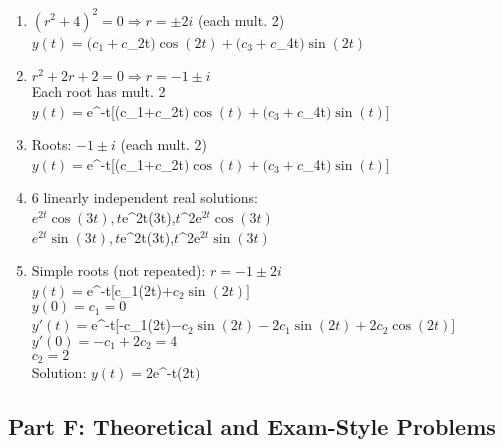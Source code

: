 \documentclass[12pt]{article}
\begin{document}
\begin{enumerate}[resume]
\item $(r^{2} + 4)^{2} = 0 \Rightarrow r = \pm 2i$ (each mult. 2)\\
$y(t) = (c_{1} + c$_{2t}$)\cos(2t) + (c_{3} + c$_{4t}$)\sin(2t)$

\item $r^{2} + 2r + 2 = 0 \Rightarrow r = -1 \pm i$\\
Each root has mult. 2\\
$y(t) = $e^{-t}[(c_{1}$ + c$_{2t}$)\cos(t) + (c_{3} + c$_{4t}$)\sin(t)]$

\item Roots: $-1 \pm i$ (each mult. 2)\\
$y(t) = $e^{-t}[(c_{1}$ + c$_{2t}$)\cos(t) + (c_{3} + c$_{4t}$)\sin(t)]$

\item 6 linearly independent real solutions:\\
$e^{2t}\cos(3t), t$e^{2t}\cos(3t),$ t$^{2e}$^{2t}\cos(3t)$\\
$e^{2t}\sin(3t), t$e^{2t}\sin(3t),$ t$^{2e}$^{2t}\sin(3t)$

\item Simple roots (not repeated): $r = -1 \pm 2i$\\
$y(t) = $e^{-t}[c_{1}\cos(2t)$ + c_{2}\sin(2t)]$\\
$y(0) = c_{1} = 0$\\
$y'(t) = $e^{-t}[-c_{1}\cos(2t)$ - c_{2}\sin(2t) - 2c_{1}\sin(2t) + 2c_{2}\cos(2t)]$\\
$y'(0) = -c_{1} + 2c_{2} = 4$\\
$c_{2} = 2$\\
Solution: $y(t) = 2$e^{-t}\sin(2t$)$
\end{enumerate}

\subsection*{Part F: Theoretical and Exam-Style Problems}
\end{document}
